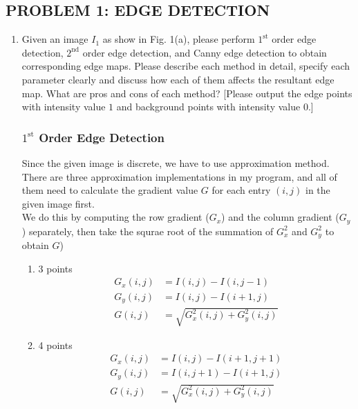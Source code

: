 \documentclass{article}
\begin{document}
\newpage
\subsection*{PROBLEM 1: EDGE DETECTION}

\begin{enumerate}[label=(\alph*)]

    \item Given an image $I_1$ as show in Fig. 1(a), please perform $1^\text{st}$ order edge detection, $2^\text{nd}$ order edge detection, and Canny edge detection to obtain corresponding edge maps. Please describe each method in detail, specify each parameter clearly and discuss how each of them affects the resultant edge map. What are pros and cons of each method? [Please output the edge points with intensity value $1$ and background points with intensity value $0$.]

    \subsubsection*{$1^\text{st}$ Order Edge Detection}

    Since the given image is discrete, we have to use approximation method. There are three approximation implementations in my program, and all of them need to calculate the gradient value $G$ for each entry $(i, j)$ in the given image first. \\

    We do this by computing the row gradient ($G_x$) and the column gradient ($G_y$) separately, then take the squrae root of the summation of $G_x^2$ and $G_y^2$ to obtain $G$)

    \begin{enumerate}[label=(\roman*)]
        \item 3 points
        \begin{align*}
            G_x(i, j) & = I(i, j) - I(i, j - 1) \\
            G_y(i, j) & = I(i, j) - I(i + 1, j) \\
            G(i, j) & = \sqrt{G_x^2(i, j) + G_y^2(i, j)}
        \end{align*}

        \item 4 points
        \begin{align*}
            G_x(i, j) & = I(i, j) - I(i + 1, j + 1) \\
            G_y(i, j) & = I(i, j + 1) - I(i + 1, j) \\
            G(i, j) & = \sqrt{G_x^2(i, j) + G_y^2(i, j)}
        \end{align*}


\end{enumerate}
\end{enumerate}
\end{document}
